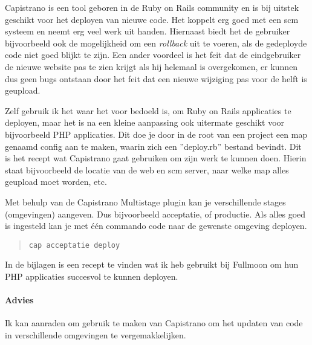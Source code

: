 Capistrano is een tool geboren in de Ruby on Rails community en is bij uitstek geschikt voor het deployen van nieuwe code. Het koppelt erg goed met een {\sc scm} systeem en neemt erg veel werk uit handen. Hiernaast biedt het de gebruiker bijvoorbeeld ook de mogelijkheid om een \emph{rollback} uit te voeren, als de gedeployde code niet goed blijkt te zijn. Een ander voordeel is het feit dat de eindgebruiker de nieuwe website pas te zien krijgt als hij helemaal is overgekomen, er kunnen dus geen bugs ontstaan door het feit dat een nieuwe wijziging pas voor de helft is geupload.

Zelf gebruik ik het waar het voor bedoeld is, om Ruby on Rails applicaties te deployen, maar het is na een kleine aanpassing ook uitermate geschikt voor bijvoorbeeld PHP applicaties. Dit doe je door in de root van een project een map genaamd config aan te maken, waarin zich een ''deploy.rb'' bestand bevindt. Dit is het recept wat Capistrano gaat gebruiken om zijn werk te kunnen doen. Hierin staat bijvoorbeeld de locatie van de web en {\sc scm} server, naar welke map alles geupload moet worden, etc.

Met behulp van de Capistrano Multistage plugin\cite{capistranomultistage} kan je verschillende stages (omgevingen) aangeven. Dus bijvoorbeeld acceptatie, of productie. Als alles goed is ingesteld kan je met \'{e}\'{e}n commando code naar de gewenste omgeving deployen.

\begin{quote}
  \texttt{cap acceptatie deploy}
\end{quote}

In de bijlagen is een recept te vinden wat ik heb gebruikt bij Fullmoon om hun PHP applicaties succesvol te kunnen deployen.

\paragraph{Advies} Ik kan aanraden om gebruik te maken van Capistrano om het updaten van code in verschillende omgevingen te vergemakkelijken.
